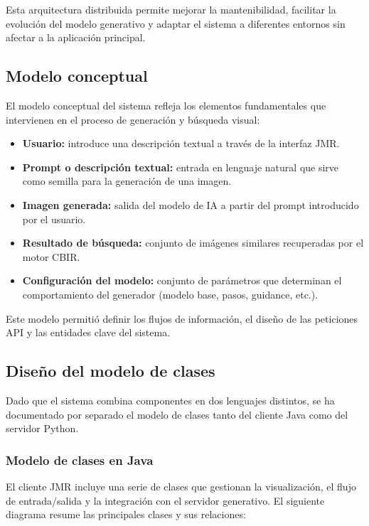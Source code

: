 Esta arquitectura distribuida permite mejorar la mantenibilidad, facilitar la evolución del modelo generativo y adaptar el sistema a diferentes entornos sin afectar a la aplicación principal.

\subsection{Modelo conceptual}

El modelo conceptual del sistema refleja los elementos fundamentales que intervienen en el proceso de generación y búsqueda visual:

\begin{itemize}
    \item \textbf{Usuario:} introduce una descripción textual a través de la interfaz JMR.
    \item \textbf{Prompt o descripción textual:} entrada en lenguaje natural que sirve como semilla para la generación de una imagen.
    \item \textbf{Imagen generada:} salida del modelo de IA a partir del prompt introducido por el usuario.
    \item \textbf{Resultado de búsqueda:} conjunto de imágenes similares recuperadas por el motor CBIR.
    \item \textbf{Configuración del modelo:} conjunto de parámetros que determinan el comportamiento del generador (modelo base, pasos, guidance, etc.).
\end{itemize}

Este modelo permitió definir los flujos de información, el diseño de las peticiones API y las entidades clave del sistema.

\subsection{Diseño del modelo de clases}

Dado que el sistema combina componentes en dos lenguajes distintos, se ha documentado por separado el modelo de clases tanto del cliente Java como del servidor Python.

\subsubsection{Modelo de clases en Java}

El cliente JMR incluye una serie de clases que gestionan la visualización, el flujo de entrada/salida y la integración con el servidor generativo. El siguiente diagrama resume las principales clases y sus relaciones:

